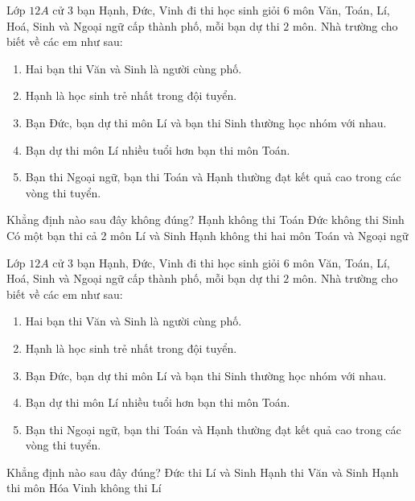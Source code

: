 \begin{ex}
Lớp $12A$ cử $3$ bạn Hạnh, Đức, Vinh đi thi học sinh giỏi $6$ môn Văn, Toán, Lí, Hoá, Sinh và Ngoại ngữ cấp thành phố, mỗi bạn dự thi $2$ môn. Nhà trường cho biết về các em như sau:
\begin{enumerate}
\item Hai bạn thi Văn và Sinh là người cùng phố.
\item Hạnh là học sinh trẻ nhất trong đội tuyển.
\item Bạn Đức, bạn dự thi môn Lí và bạn thi Sinh thường học nhóm với nhau.
\item Bạn dự thi môn Lí nhiều tuổi hơn bạn thi môn Toán.
\item Bạn thi Ngoại ngữ, bạn thi Toán và Hạnh thường đạt kết quả cao trong các vòng thi tuyển.
\end{enumerate}
Khẳng định nào sau đây không đúng?
\choice
{Hạnh không thi Toán}
{Đức không thi Sinh}
{\True Có một bạn thi cả 2 môn Lí và Sinh}
{Hạnh không thi hai môn Toán và Ngoại ngữ}
\end{ex}

\begin{ex}
Lớp $12A$ cử $3$ bạn Hạnh, Đức, Vinh đi thi học sinh giỏi $6$ môn Văn, Toán, Lí, Hoá, Sinh và Ngoại ngữ cấp thành phố, mỗi bạn dự thi $2$ môn. Nhà trường cho biết về các em như sau:
\begin{enumerate} 
\item Hai bạn thi Văn và Sinh là người cùng phố.
\item Hạnh là học sinh trẻ nhất trong đội tuyển.
\item Bạn Đức, bạn dự thi môn Lí và bạn thi Sinh thường học nhóm với nhau.
\item Bạn dự thi môn Lí nhiều tuổi hơn bạn thi môn Toán.
\item Bạn thi Ngoại ngữ, bạn thi Toán và Hạnh thường đạt kết quả cao trong các vòng thi tuyển.
\end{enumerate}
Khẳng định nào sau đây đúng?
\choice
{Đức thi Lí và Sinh}
{Hạnh thi Văn và Sinh}
{\True Hạnh thi môn Hóa}
{Vinh không thi Lí}
\end{ex}

